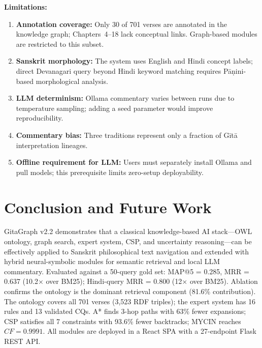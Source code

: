 \documentclass[conference]{IEEEtran}
\begin{document}
\textbf{Limitations:}
\begin{enumerate}[leftmargin=*]
  \item \textbf{Annotation coverage:} Only 30 of 701 verses are annotated in the
        knowledge graph; Chapters~4--18 lack conceptual links. Graph-based modules
        are restricted to this subset.
  \item \textbf{Sanskrit morphology:} The system uses English and Hindi concept labels;
        direct Devanagari query beyond Hindi keyword matching requires P\={a}{\d{n}}ini-based
        morphological analysis.
  \item \textbf{LLM determinism:} Ollama commentary varies between runs due to
        temperature sampling; adding a seed parameter would improve reproducibility.
  \item \textbf{Commentary bias:} Three traditions represent only a fraction of
        G\={i}t\={a} interpretation lineages.
  \item \textbf{Offline requirement for LLM:} Users must separately install Ollama
        and pull models; this prerequisite limits zero-setup deployability.
\end{enumerate}

\section{Conclusion and Future Work}

GitaGraph v2.2 demonstrates that a classical knowledge-based AI stack—OWL
ontology, graph search, expert system, CSP, and uncertainty reasoning—can be
effectively applied to Sanskrit philosophical text navigation and extended with
hybrid neural-symbolic modules for semantic retrieval and local LLM commentary.
Evaluated against a 50-query gold set: MAP@5 = 0.285, MRR = 0.637 (10.2$\times$
over BM25); Hindi-query MRR = 0.800 (12$\times$ over BM25). Ablation confirms
the ontology is the dominant retrieval component (81.6\% contribution). The
ontology covers all 701 verses (3,523 RDF triples); the expert system has 16
rules and 13 validated CQs. A* finds 3-hop paths with 63\% fewer expansions;
CSP satisfies all 7 constraints with 93.6\% fewer backtracks; MYCIN reaches
$CF = 0.9991$. All modules are deployed in a React SPA with a 27-endpoint
Flask REST API.
\end{document}
